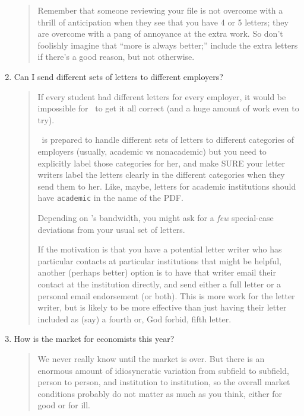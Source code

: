 \documentclass{\classes/econtex}
\begin{document}
\begin{enumerate}
\begin{quote}
    Remember that someone reviewing your file is not overcome with
    a thrill of anticipation when they see that you have 4 or 5 letters; they
    are overcome with a pang of annoyance at the extra work.  So don't foolishly
    imagine that ``more is always better;'' include the extra letters if
    there's a good reason, but not otherwise.


  \end{quote}
\item  Can I send different sets of letters to different employers?

  \begin{quote}
    If every student had different letters for every employer, it would be impossible for {\JMStaffName}~to get it all correct (and a huge amount of work even to try).

    {\JMStaffName}~is prepared to handle different sets of letters to different categories of employers (usually, academic vs nonacademic) but you need to explicitly label those categories for her, and make SURE your letter writers label the letters clearly in the different categories when they send them to her.  Like, maybe, letters for academic institutions should have \texttt{academic} in the name of the PDF.

    Depending on {\JMStaffName}'s bandwidth, you might ask for a \textit{few} special-case deviations from your usual set of letters.

    If the motivation is that you have a potential letter writer who has particular contacts at particular institutions that might be helpful, another (perhaps better) option is to have that writer email their contact at the institution directly, and send either a full letter or a personal email endorsement (or both).  This is more work for the letter writer, but is likely to be more effective than just having their letter included as (say) a fourth or, God forbid, fifth letter.

  \end{quote}
\item  How is the market for economists this year?

  \begin{quote}
    We never really know until the market is over.  But there is an enormous amount of idiosyncratic
    variation from subfield to subfield, person to person, and institution to
    institution, so the overall market conditions probably do not matter as much
    as you think, either for good or for ill.


\end{quote}
\end{enumerate}
\end{document}
